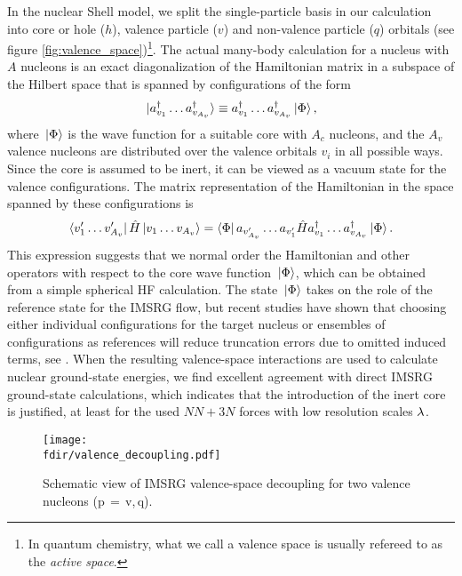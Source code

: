 {In the nuclear Shell model, we split the single-particle basis in our 
calculation into core or hole ($h$), valence particle ($v$) and non-valence 
particle ($q$) orbitals (see figure \ref{fig:valence_space})\footnote{In
quantum chemistry, what we call a valence space is usually refereed to as
the \emph{active space}.}. The actual many-body calculation for a nucleus
with $A$ nucleons is an exact diagonalization of the Hamiltonian matrix in a 
subspace of the Hilbert space that is spanned by configurations 
of the form
\begin{equation}\label{eq:def_configurations}
  \ket{\aaO_{v_1}\ldots\aaO_{v_{A_v}}} \equiv \aaO_{v_1}\ldots\aaO_{v_{A_v}}\ket{\Phi}\,,
\end{equation}
where $\,|{\Phi}\rangle$ is the wave function for a suitable core with $A_c$
nucleons, and the $A_v$ valence nucleons are distributed over the valence
orbitals $v_i$ in all possible ways. Since the core is assumed to be inert, 
it can be viewed as a vacuum state for the valence configurations. The matrix 
representation of the Hamiltonian in the space spanned by these configurations 
is
\begin{equation}
  \langle{v'_{1}\ldots v'_{A_v}}|\,{\hat{H}}\,|{v_{1}\ldots v_{A_v}}\rangle
  = \langle{\Phi}|\,{a_{v'_{A_v}}\ldots a_{v'_1}\hat{H}a^\dag_{v_1}\ldots a^\dag_{v_{A_v}}}\,|{\Phi}\rangle\,.
\end{equation}
This expression suggests that we normal order the Hamiltonian and other 
operators with respect to the core wave function $\,|{\Phi}\rangle$, which can
be obtained from a simple spherical HF calculation. The state $\,|{\Phi}\rangle$
takes on the role of the reference state for the IMSRG flow, but recent
studies have shown that choosing either individual configurations for the 
target nucleus or ensembles of configurations as references will reduce 
truncation errors due to omitted induced terms, see 
\cite{Stroberg:2016fk,Stroberg:2016th}. When the resulting valence-space
interactions are used to calculate nuclear ground-state energies, we find
excellent agreement with direct IMSRG ground-state calculations, which 
indicates that the introduction of the inert core is justified, at least
for the used $NN+3N$ forces with low resolution scales $\lambda$.

\begin{figure}[t]
  \begin{center}
    \texttt{[image: \\fdir/valence\_decoupling.pdf]}
  \end{center}
  \caption{\label{fig:valence_decoupling}
    Schematic view of IMSRG valence-space decoupling for two valence nucleons (p$\,=\,$v,\,q).
  }
\end{figure}


}
